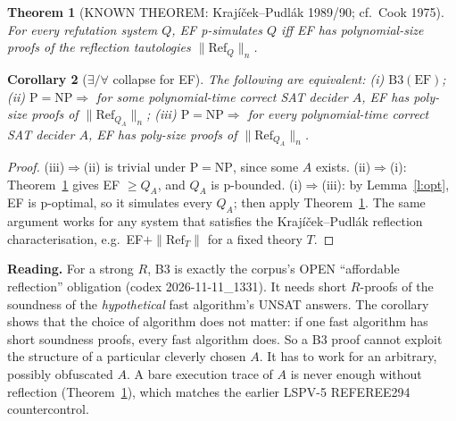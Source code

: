 \documentclass[11pt]{article}
\newtheorem{theorem}{Theorem}
\newtheorem{corollary}[theorem]{Corollary}
\theoremstyle{definition}
\begin{document}
\begin{theorem}[KNOWN THEOREM: Krajíček--Pudlák 1989/90; cf.\ Cook 1975]\label{t:kp}
For every refutation system $Q$, EF p-simulates $Q$ iff EF has polynomial-size
proofs of the reflection tautologies $\|\mathrm{Ref}_Q\|_n$.
\end{theorem}

\begin{corollary}[$\exists/\forall$ collapse for EF]\label{c:ea}
The following are equivalent:
(i) $\mathrm{B3}(\mathrm{EF})$;
(ii) $\mathrm P=\mathrm{NP}\Rightarrow$ for \emph{some} polynomial-time correct
SAT decider $A$, EF has poly-size proofs of $\|\mathrm{Ref}_{Q_A}\|_n$;
(iii) $\mathrm P=\mathrm{NP}\Rightarrow$ for \emph{every} polynomial-time correct
SAT decider $A$, EF has poly-size proofs of $\|\mathrm{Ref}_{Q_A}\|_n$.
\end{corollary}
\begin{proof}
(iii)$\Rightarrow$(ii) is trivial under $\mathrm P=\mathrm{NP}$, since some $A$ exists.
(ii)$\Rightarrow$(i): Theorem~\ref{t:kp} gives EF $\ge Q_A$, and $Q_A$ is p-bounded.
(i)$\Rightarrow$(iii): by Lemma~\ref{l:opt}, EF is p-optimal, so it simulates every
$Q_A$; then apply Theorem~\ref{t:kp}. The same argument works for any system
that satisfies the Krajíček--Pudlák reflection characterisation, e.g.\
EF$+\|\mathrm{Ref}_T\|$ for a fixed theory $T$.
\end{proof}
\textbf{Reading.} For a strong $R$, B3 is exactly the corpus's OPEN
``affordable reflection'' obligation (codex 2026-11-11\_1331). It needs short
$R$-proofs of the soundness of the \emph{hypothetical} fast algorithm's UNSAT
answers. The corollary shows that the choice of algorithm does not matter: if
one fast algorithm has short soundness proofs, every fast algorithm does. So a
B3 proof cannot exploit the structure of a particular cleverly chosen $A$. It
has to work for an arbitrary, possibly obfuscated $A$. A bare execution trace
of $A$ is never enough without reflection (Theorem~\ref{t:kp}), which matches
the earlier LSPV-5 REFEREE294 countercontrol.
\end{document}
